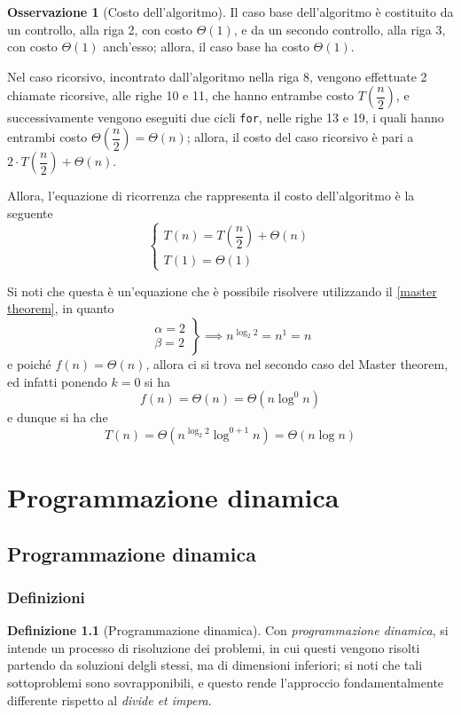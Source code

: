 \documentclass[14pt]{extreport}
\theoremstyle{definition}
\newtheorem{definition}{Definizione}[subsection]
\theoremstyle{definition}
\newtheorem{remark}{Osservazione}[subsection]
\begin{document}
\begin{remark}[Costo dell'algoritmo]
    Il caso base dell'algoritmo è costituito da un controllo, alla riga 2, con costo $\Theta(1)$, e da un secondo controllo, alla riga 3, con costo $\Theta(1)$ anch'esso; allora, il caso base ha costo $\Theta(1)$.

    Nel caso ricorsivo, incontrato dall'algoritmo nella riga 8, vengono effettuate 2 chiamate ricorsive, alle righe 10 e 11, che hanno entrambe costo $T\left(\dfrac{n}{2}\right)$, e successivamente vengono eseguiti due cicli \texttt{for}, nelle righe 13 e 19, i quali hanno entrambi costo $\Theta\left(\dfrac{n}{2}\right) = \Theta(n)$; allora, il costo del caso ricorsivo è pari a $2 \cdot T\left(\dfrac{n}{2}\right) + \Theta(n)$.

    Allora, l'equazione di ricorrenza che rappresenta il costo dell'algoritmo è la seguente $$\left \{ \begin{array}{l} T(n) = T\left(\dfrac{n}{2}\right) + \Theta(n) \\ T(1) = \Theta(1) \end{array} \right .$$

    Si noti che questa è un'equazione che è possibile risolvere utilizzando il \cref{master theorem}, in quanto $$\left . \begin{array}{l} \alpha = 2 \\ \beta = 2 \end{array} \right \} \implies n ^ {\log_{2}{2}} = n^1 = n$$ e poiché $f(n) = \Theta(n)$, allora ci si trova nel secondo caso del Master theorem, ed infatti ponendo $k = 0$ si ha $$f(n) = \Theta(n) = \Theta(n \log^0 n)$$ e dunque si ha che $$T(n) = \Theta(n ^{\log_{2}{2}} \log ^ {0 + 1}n) = \Theta(n \log n)$$
\end{remark}

\chapter{Programmazione dinamica}

\section{Programmazione dinamica}

\subsection{Definizioni}

\begin{definition}[Programmazione dinamica]
    Con \textit{programmazione dinamica}, si intende un processo di risoluzione dei problemi, in cui questi vengono risolti partendo da soluzioni delgli stessi, ma di dimensioni inferiori; si noti che tali sottoproblemi sono sovrapponibili, e questo rende l'approccio fondamentalmente differente rispetto al \textit{divide et impera}.
\end{definition}
\end{document}
